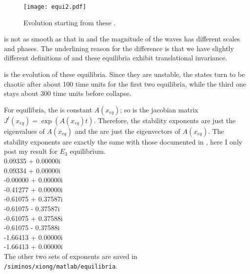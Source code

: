 \begin{figure}[h]
 \centering
 \texttt{[image: equi2.pdf]}
 \caption{Evolution starting from these \eqva.}
 \label{fig:xequi2}
\end{figure}

 is not as smooth as that in  and the magnitude of the waves has different
scales and phases. The underlining reason for the difference is that
 we have slightly different definitions of \xDft and  these equilibria exhibit  translational invariance.

  is the evolution of these equilibria. Since they are unstable, the states turn to be
 chaotic after about 100 time units for the first two equilibria, while the third one stays about 300 time units
 before collapse.



 For equilibria, the {\stabmat} is constant $A(x_{eq})$; so is the jacobian matrix
 $J^{t}(x_{eq})=\exp(A(x_{eq})t)$.
 Therefore, the stability exponents are just the eigenvalues of $A(x_{eq})$ and the {\cLvs}
 are just the eigenvectors of $A(x_{eq})$.  The stability exponents  are exactly the same with those documented in
  , here I only post my result for $E_{3}$ equilibrium.
 \\
   0.09335 + 0.00000i \\
   0.09334 + 0.00000i \\
  -0.00000 + 0.00000i  \\
  -0.41277 + 0.00000i\\
  -0.61075 + 0.37587i\\
  -0.61075 - 0.37587i \\
  -0.61075 + 0.37588i \\
  -0.61075 - 0.37588i \\
  -1.66413 + 0.00000i \\
  -1.66413 + 0.00000i \\

The other two sets of exponents are saved in \\
\texttt{/siminos/xiong/matlab/equilibria}.


